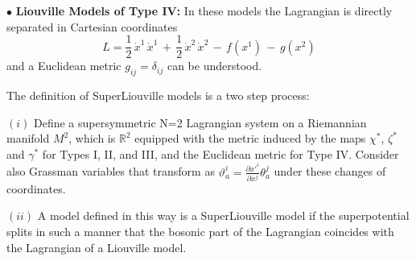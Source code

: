 \documentclass[a4paper,11pt,twoside]{article}
\def\r{\mathbb R}                   %
\begin{document}
\vspace*{0.1cm}

\noindent $\bullet$ {\bf Liouville Models of Type IV:} In these models the
Lagrangian is directly separated in Cartesian coordinates
\begin{equation}
L = \displaystyle\frac{1}{2} \,\dot{x}^1 \, \dot{x}^1 \,+\, \displaystyle\frac{1}{2} \, \dot{x}^2 \, \dot{x}^2\, -\,f(x^1)\,-\,g(x^2)
\label{eq:liou4}
\end{equation}
and a  Euclidean metric $g_{ij}=\delta_{ij}$ can be understood.

\vspace{0.1cm}

The definition of SuperLiouville models is a two step process:

$(i)$ Define a supersymmetric N=2 Lagrangian system on a
Riemannian manifold $M^2$, which is $\r^2$ equipped with the
metric induced by the maps $\chi^*$, $\zeta^*$ and $\gamma^*$ for
Types I, II, and III, and the Euclidean metric for Type IV.
Consider also Grassman variables that transform as
$\vartheta^i_a=\frac{\partial {x'}^i}{\partial x^j} \theta^j_a$
under these changes of coordinates.

$(ii)$ A model defined in this way is a SuperLiouville model if the
superpotential splits in such a manner that the bosonic part of
the Lagrangian coincides with the Lagrangian of a Liouville model.

\vspace*{0.1cm}
\end{document}
